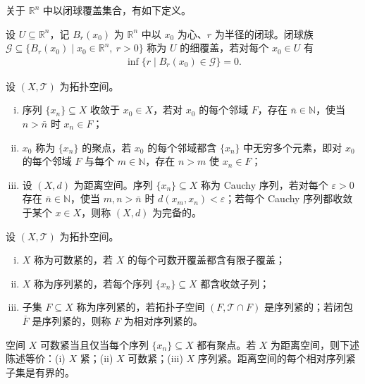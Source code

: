 \documentclass[../main.tex]{subfiles}
\begin{document}
关于 $\mathbb{R}^n$ 中以闭球覆盖集合，有如下定义。

\begin{definition}[细覆盖]\label{definition:appA-细覆盖}
设 $U\subseteq\mathbb{R}^n$，记 $B_r(x_0)$ 为 $\mathbb{R}^n$ 中以 $x_0$ 为心、$r$ 为半径的闭球。闭球族 $\mathscr{G}\subseteq\{B_r(x_0)\mid x_0\in\mathbb{R}^n,\ r>0\}$ 称为 $U$ 的细覆盖，若对每个 $x_0\in U$ 有
\begin{align*}
\inf\{r\mid B_r(x_0)\in\mathscr{G}\}=0.
\end{align*}
\end{definition}

\begin{definition}[收敛、聚点与完备距离空间]\label{definition:appA-收敛聚点}
设 $(X,\mathscr{T})$ 为拓扑空间。
\begin{enumerate}[(i)]
\item 序列 $\{x_n\}\subseteq X$ 收敛于 $x_0\in X$，若对 $x_0$ 的每个邻域 $F$，存在 $\bar n\in\mathbb{N}$，使当 $n>\bar n$ 时 $x_n\in F$；
\item $x_0$ 称为 $\{x_n\}$ 的聚点，若 $x_0$ 的每个邻域都含 $\{x_n\}$ 中无穷多个元素，即对 $x_0$ 的每个邻域 $F$ 与每个 $m\in\mathbb{N}$，存在 $n>m$ 使 $x_n\in F$；
\item 设 $(X,d)$ 为距离空间。序列 $\{x_n\}\subseteq X$ 称为 Cauchy 序列，若对每个 $\varepsilon>0$ 存在 $\bar n\in\mathbb{N}$，使当 $m,n>\bar n$ 时 $d(x_m,x_n)<\varepsilon$；若每个 Cauchy 序列都收敛于某个 $x\in X$，则称 $(X,d)$ 为完备的。
\end{enumerate}
\end{definition}

\begin{definition}[可数紧与序列紧]\label{definition:appA-可数序列紧}
设 $(X,\mathscr{T})$ 为拓扑空间。
\begin{enumerate}[(i)]
\item $X$ 称为可数紧的，若 $X$ 的每个可数开覆盖都含有限子覆盖；
\item $X$ 称为序列紧的，若每个序列 $\{x_n\}\subseteq X$ 都含收敛子列；
\item 子集 $F\subseteq X$ 称为序列紧的，若拓扑子空间 $(F,\mathscr{T}\cap F)$ 是序列紧的；若闭包 $\overline{F}$ 是序列紧的，则称 $F$ 为相对序列紧的。
\end{enumerate}
\end{definition}

空间 $X$ 可数紧当且仅当每个序列 $\{x_n\}\subseteq X$ 都有聚点。若 $X$ 为距离空间，则下述陈述等价：(i) $X$ 紧；(ii) $X$ 可数紧；(iii) $X$ 序列紧。距离空间的每个相对序列紧子集是有界的。
\end{document}
